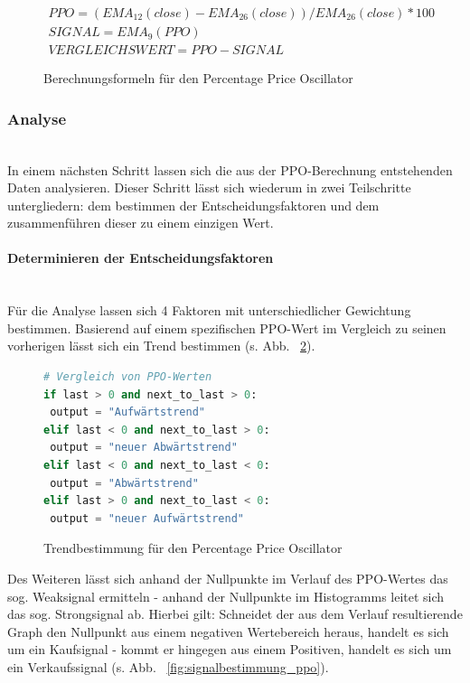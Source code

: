 \begin{figure}[!ht]
\begin{gather*} 
PPO = ( EMA_{12}(close) - EMA_{26}(close) ) / EMA_{26}(close) * 100 \\ 
SIGNAL =  EMA_9( PPO )\\
VERGLEICHSWERT = PPO - SIGNAL
\end{gather*}
\caption{Berechnungsformeln für den Percentage Price Oscillator \cite{tvWikiPpo}}
\label{fig:formular_ppo}
\end{figure}

\subsubsection{Analyse}~\\
\label{subsec_analysis_ppo}
In einem nächsten Schritt lassen sich die aus der PPO-Berechnung entstehenden Daten analysieren. Dieser Schritt lässt sich wiederum in zwei Teilschritte untergliedern: dem bestimmen der Entscheidungsfaktoren und dem zusammenführen dieser zu einem einzigen Wert.

\paragraph{Determinieren der Entscheidungsfaktoren}~\\
\label{subsubsec_analysis_calc_ppo}
Für die Analyse lassen sich 4 Faktoren mit unterschiedlicher Gewichtung bestimmen. Basierend auf einem spezifischen PPO-Wert im Vergleich zu seinen vorherigen lässt sich ein Trend bestimmen (s. Abb. ~\ref{fig:trendbestimmung_ppo}).

\begin{figure}[!ht]
\begin{lstlisting}[language=Python]
# Vergleich von PPO-Werten
if last > 0 and next_to_last > 0:
 output = "Aufwärtstrend"
elif last < 0 and next_to_last > 0:
 output = "neuer Abwärtstrend"
elif last < 0 and next_to_last < 0:
 output = "Abwärtstrend"
elif last > 0 and next_to_last < 0:
 output = "neuer Aufwärtstrend"
\end{lstlisting}
\caption{Trendbestimmung für den Percentage Price Oscillator}
\label{fig:trendbestimmung_ppo}
\end{figure}

Des Weiteren lässt sich anhand der Nullpunkte im Verlauf des PPO-Wertes das sog. Weaksignal ermitteln - anhand der Nullpunkte im Histogramms leitet sich das sog. Strongsignal ab. Hierbei gilt: Schneidet der aus dem Verlauf resultierende Graph den Nullpunkt aus einem negativen Wertebereich heraus, handelt es sich um ein Kaufsignal - kommt er hingegen aus einem Positiven, handelt es sich um ein Verkaufssignal (s. Abb. ~\ref{fig:signalbestimmung_ppo}). 

